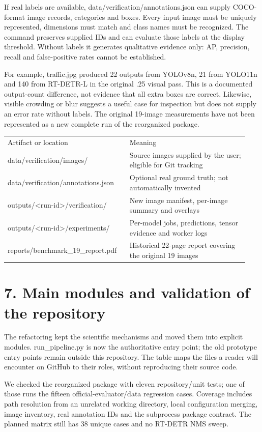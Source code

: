 \documentclass[10pt]{article}
\begin{document}
If real labels are available, data/verification/annotations.json can supply COCO-format image records, categories and boxes. Every input image must be uniquely represented, dimensions must match and class names must be recognized. The command preserves supplied IDs and can evaluate those labels at the display threshold. Without labels it generates qualitative evidence only: AP, precision, recall and false-positive rates cannot be established.


For example, traffic.jpg produced 22 outputs from YOLOv8n, 21 from YOLO11n and 140 from RT-DETR-L in the original .25 visual pass. This is a documented output-count difference, not evidence that all extra boxes are correct. Likewise, visible crowding or blur suggests a useful case for inspection but does not supply an error rate without labels. The original 19-image measurements have not been represented as a new complete run of the reorganized package.


\begin{longtable}{p{0.470\linewidth}p{0.470\linewidth}}
Artifact or location & Meaning \\
data/verification/images/ & Source images supplied by the user; eligible for Git tracking \\
data/verification/annotations.json & Optional real ground truth; not automatically invented \\
outputs/<run-id>/verification/ & New image manifest, per-image summary and overlays \\
outputs/<run-id>/experiments/ & Per-model jobs, predictions, tensor evidence and worker logs \\
reports/benchmark\_19\_report.pdf & Historical 22-page report covering the original 19 images \\
\end{longtable}
\clearpage
\section*{7. Main modules and validation of the repository}
The refactoring kept the scientific mechanisms and moved them into explicit modules. run\_pipeline.py is now the authoritative entry point; the old prototype entry points remain outside this repository. The table maps the files a reader will encounter on GitHub to their roles, without reproducing their source code.


We checked the reorganized package with eleven repository/unit tests; one of those runs the fifteen official-evaluator/data regression cases. Coverage includes path resolution from an unrelated working directory, local configuration merging, image inventory, real annotation IDs and the subprocess package contract. The planned matrix still has 38 unique cases and no RT-DETR NMS sweep.
\end{document}
